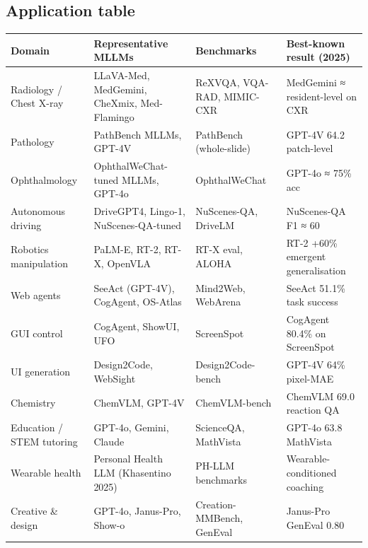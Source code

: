 \subsection{Application table}\label{application-table}

{\def\LTcaptype{none} %
\begin{longtable}[]{@{}
  >{\raggedright\arraybackslash}p{}
  >{\raggedright\arraybackslash}p{}
  >{\raggedright\arraybackslash}p{}
  >{\raggedright\arraybackslash}p{}@{}}
\toprule\noalign{}
\begin{minipage}[b]{\linewidth}\raggedright
\textbf{Domain}
\end{minipage} & \begin{minipage}[b]{\linewidth}\raggedright
\textbf{Representative MLLMs}
\end{minipage} & \begin{minipage}[b]{\linewidth}\raggedright
\textbf{Benchmarks}
\end{minipage} & \begin{minipage}[b]{\linewidth}\raggedright
\textbf{Best-known result (2025)}
\end{minipage} \\
\midrule\noalign{}
\endhead
\bottomrule\noalign{}
\endlastfoot
Radiology / Chest X-ray & LLaVA-Med, MedGemini, CheXmix, Med-Flamingo & ReXVQA, VQA-RAD, MIMIC-CXR & MedGemini ≈ resident-level on CXR \\
Pathology & PathBench MLLMs, GPT-4V & PathBench (whole-slide) & GPT-4V 64.2 patch-level \\
Ophthalmology & OphthalWeChat-tuned MLLMs, GPT-4o & OphthalWeChat & GPT-4o ≈ 75\% acc \\
Autonomous driving & DriveGPT4, Lingo-1, NuScenes-QA-tuned & NuScenes-QA, DriveLM & NuScenes-QA F1 ≈ 60 \\
Robotics manipulation & PaLM-E, RT-2, RT-X, OpenVLA & RT-X eval, ALOHA & RT-2 +60\% emergent generalisation \\
Web agents & SeeAct (GPT-4V), CogAgent, OS-Atlas & Mind2Web, WebArena & SeeAct 51.1\% task success \\
GUI control & CogAgent, ShowUI, UFO & ScreenSpot & CogAgent 80.4\% on ScreenSpot \\
UI generation & Design2Code, WebSight & Design2Code-bench & GPT-4V 64\% pixel-MAE \\
Chemistry & ChemVLM, GPT-4V & ChemVLM-bench & ChemVLM 69.0 reaction QA \\
Education / STEM tutoring & GPT-4o, Gemini, Claude & ScienceQA, MathVista & GPT-4o 63.8 MathVista \\
Wearable health & Personal Health LLM (Khasentino 2025) & PH-LLM benchmarks & Wearable-conditioned coaching \\
Creative \& design & GPT-4o, Janus-Pro, Show-o & Creation-MMBench, GenEval & Janus-Pro GenEval 0.80 \\
\end{longtable}
}

